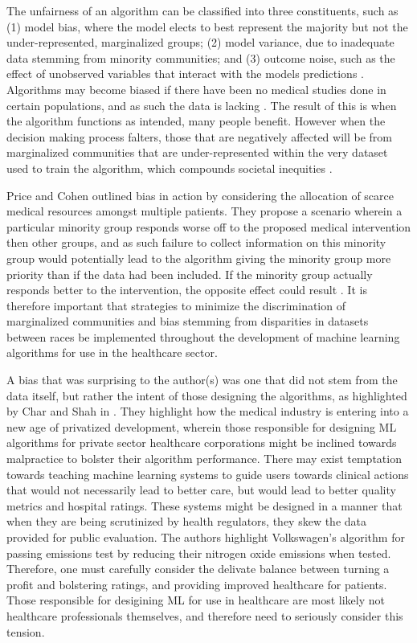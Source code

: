 \documentclass[12pt]{article}
\begin{document}
The unfairness of an algorithm can be classified into three constituents, such as (1) model bias, where the model elects to best represent the majority but not the under-represented, marginalized groups; (2) model variance, due to inadequate data stemming from minority communities; and (3) outcome noise, such as the effect of unobserved variables that interact with the models predictions \citep{Chen_2018}. 
Algorithms may become biased if there have been no medical studies done in certain populations, and as such the data is lacking \citep{Char_2018}. The result of this is when the algorithm functions as intended, many people benefit. However when the decision making process falters, those that are negatively affected will be from marginalized communities that are under-represented within the very dataset used to train the algorithm, which compounds societal inequities \citep{Panch_2018}.


Price and Cohen outlined bias in action by considering the allocation of scarce medical resources amongst multiple patients. They propose a scenario wherein a particular minority group responds worse off to the proposed medical intervention then other groups, and as such failure to collect information on this minority group would potentially lead to the algorithm giving the minority group more priority than if the data had been included. If the minority group actually responds better to the intervention, the opposite effect could result \citep{Price_2019}.
It is therefore important that strategies to minimize the discrimination of marginalized communities and bias stemming from disparities in datasets between races be implemented throughout the development of machine learning algorithms for use in the healthcare sector.


A bias that was surprising to the author(s) was one that did not stem from the data itself, but rather the intent of those designing the algorithms, as highlighted by Char and Shah in \citep{Char_2018}. They highlight how the medical industry is entering into a new age of privatized development, wherein those responsible for designing ML algorithms for private sector healthcare corporations might be inclined towards malpractice to bolster their algorithm performance. There may exist temptation towards teaching machine learning systems to guide users towards clinical actions that would not necessarily lead to better care, but would lead to better quality metrics and hospital ratings. These systems might be designed in a manner that when they are being scrutinized by health regulators, they skew the data provided for public evaluation. The authors highlight Volkswagen's algorithm for passing emissions test by reducing their nitrogen oxide emissions when tested. Therefore, one must carefully consider the delivate balance between turning a profit and bolstering ratings, and providing improved healthcare for patients. Those responsible for desigining ML for use in healthcare are most likely not healthcare professionals themselves, and therefore need to seriously consider this tension.\
\end{document}
